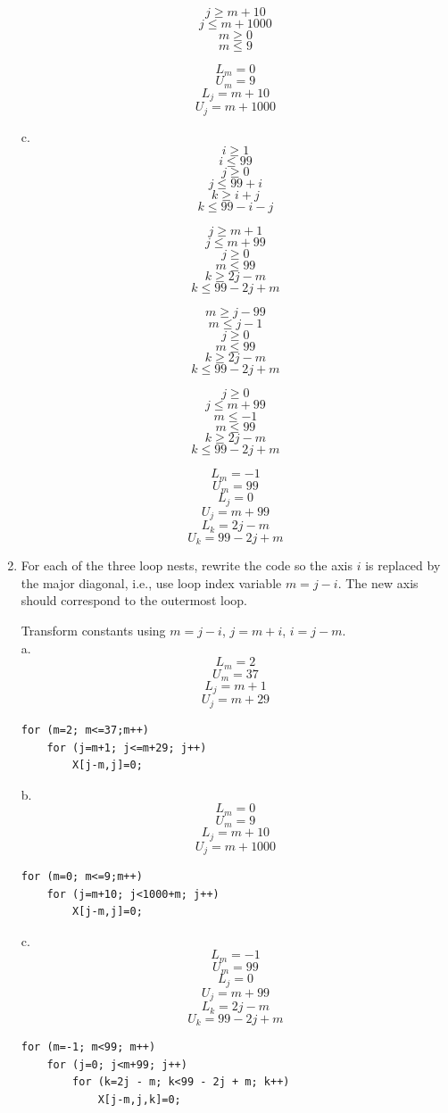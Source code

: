 \documentclass[11pt]{article}
\begin{document}
\begin{enumerate}
\begin{Answer}
		$$j \ge m + 10$$
		$$j \le m + 1000$$
		$$m \ge 0$$
		$$m \le 9$$
		
		$$L_m = 0$$
		$$U_m = 9$$
		$$L_j = m + 10$$
		$$U_j = m + 1000$$

		c.
		$$i \ge 1$$
		$$i \le 99$$
		$$j \ge 0$$
		$$j \le 99 + i$$
		$$k \ge i + j$$
		$$k \le 99 - i - j$$
		
		$$j \ge m + 1$$
		$$j \le m + 99$$
		$$j \ge 0$$
		$$m \le 99$$
		$$k \ge 2j - m$$
		$$k \le 99 - 2j + m$$
		
		$$m \ge j - 99$$
		$$m \le j - 1$$
		$$j \ge 0$$
		$$m \le 99$$
		$$k \ge 2j - m$$
		$$k \le 99 - 2j + m$$

		$$j \ge 0$$		
		$$j \le m + 99$$
		$$m \le - 1$$
		$$m \le 99$$
		$$k \ge 2j - m$$
		$$k \le 99 - 2j + m$$
		
		
		$$L_m = -1$$
		$$U_m = 99$$
		$$L_j = 0$$
		$$U_j = m + 99$$
		$$L_k = 2j - m$$
		$$U_k = 99 - 2j + m$$
		\end{Answer}
		\newpage
	\item For each of the three loop nests, rewrite the code so the axis $i$ is replaced by the major diagonal, i.e., use loop index variable $m=j-i$. The new axis should correspond to the outermost loop.
		\begin{Answer}
		Transform constants using $m=j -i$, $j = m + i$, $i = j - m$. \\
		a. 
		$$L_m = 2$$
		$$U_m = 37$$
		$$L_j = m + 1$$
		$$U_j = m + 29$$
\begin{verbatim}
for (m=2; m<=37;m++)
    for (j=m+1; j<=m+29; j++)
        X[j-m,j]=0;
\end{verbatim}
		
		b.
		$$L_m = 0$$
		$$U_m = 9$$
		$$L_j = m + 10$$
		$$U_j = m + 1000$$
		
\begin{verbatim}
for (m=0; m<=9;m++) 
    for (j=m+10; j<1000+m; j++)
        X[j-m,j]=0;
\end{verbatim}	
		c.
		$$L_m = -1$$
		$$U_m = 99$$
		$$L_j = 0$$
		$$U_j = m + 99$$
		$$L_k = 2j - m$$
		$$U_k = 99 - 2j + m$$
		
\begin{verbatim}
for (m=-1; m<99; m++)
    for (j=0; j<m+99; j++)
        for (k=2j - m; k<99 - 2j + m; k++) 
            X[j-m,j,k]=0;
\end{verbatim}
		\end{Answer}
\end{enumerate}
\end{document}
